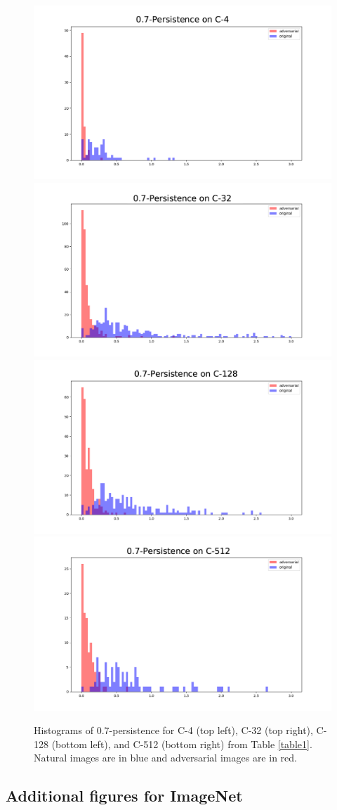 \begin{figure}[!htb]
\includegraphics[width=.49\textwidth]{c2_figures/MNIST-C-4-0-stab_compare_a_var-hist.png}
\includegraphics[width=.49\textwidth]{c2_figures/MNIST-C-32-0-stab_compare_a_var-hist.png}
\includegraphics[width=.49\textwidth]{c2_figures/MNIST-C-128-0-stab_compare_a_var-hist.png}
\includegraphics[width=.49\textwidth]{c2_figures/MNIST-C-512-0-stab_compare_a_var-hist.png}
\caption{Histograms of $0.7$-persistence for C-4 (top left), C-32 (top right), C-128 (bottom left), and C-512 (bottom right) from Table \ref{table1}. Natural images are in blue and adversarial images are in red.}
\label{fig:CNNs}
\end{figure}

\subsection{Additional figures for ImageNet}

